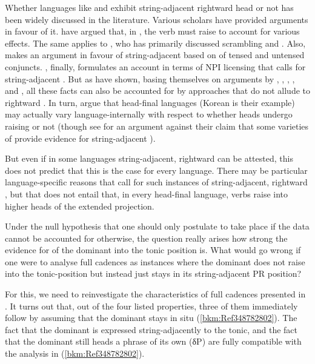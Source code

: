 \documentclass[output=paper]{langsci/langscibook}
\begin{document}
Whether languages like  and  exhibit string-adjacent rightward
head  or not has been widely discussed in the literature. Various
scholars have provided arguments in favour of it. \citet{OtaWhi1991} have
argued that, in , the verb must raise to account for various 
effects. The same applies to \textcite{Koizumi1995,Koizumi2000}, who has primarily discussed
scrambling and . Also, \citet{Yoon1994} makes an argument in favour
of string-adjacent  based on  of tensed and untensed
conjuncts. \citet{Choi1999}, finally, formulates an account in terms of NPI
licensing that calls for string-adjacent . But as
\textcite{Han:2007,HanMusLidz2016} have shown, basing themselves on arguments by \citet{Kim1995},
\citet{ChuPar1997}, \citet{Hoji1998}, \citet{Kim1999}, and \citet{FukSak2003},
all these facts can also be accounted for by approaches that do not allude to
rightward . In turn, \textcite{Han:2007,HanMusLidz2016} argue that head-final
languages (Korean is their example) may actually vary language-internally with
respect to whether heads undergo raising or not (though see
\citealt{Zeijlstra2017} for an argument against their claim that some varieties
of  provide evidence for string-adjacent ).

But even if in some languages string-adjacent, rightward  can be
attested, this does not predict that this is the case for every language. There
may be particular language-specific reasons that call for such instances of
string-adjacent, rightward , but that does not entail that, in
every head-final language, verbs raise into higher heads of the extended
projection.

Under the null hypothesis that one should only postulate  to take place
if the data cannot be accounted for otherwise, the question really arises how
strong the evidence for  of the dominant into the tonic position is.
What would go wrong if one were to analyse full cadences as instances where the
dominant does not raise into the tonic-position but instead just stays in its
string-adjacent \gls{PR} position?

For this, we need to reinvestigate the characteristics of full cadences
presented in . It turns out that, out of the four
listed properties, three of them immediately follow by assuming that the
dominant stays in situ (\ref{bkm:Ref348782802}). The fact that the dominant is
expressed string-adjacently to the tonic, and the fact that the dominant still
heads a phrase of its own (δP) are fully compatible with the analysis in
(\ref{bkm:Ref348782802}).
\end{document}
